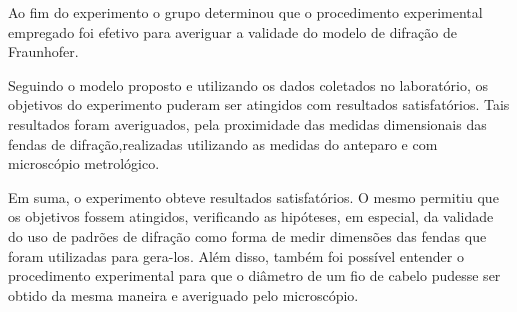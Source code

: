 Ao fim do experimento o grupo determinou que o procedimento experimental empregado foi efetivo para averiguar a validade do modelo de difração de Fraunhofer.

Seguindo o modelo proposto e utilizando os dados coletados no laboratório, os objetivos do experimento puderam ser atingidos com resultados satisfatórios. Tais resultados foram averiguados, pela proximidade das medidas dimensionais das fendas de difração,realizadas utilizando as medidas do anteparo e com microscópio metrológico.

Em suma, o experimento obteve resultados satisfatórios. O mesmo permitiu que os objetivos fossem atingidos, verificando as hipóteses, em especial, da validade do uso de padrões de difração como forma de medir dimensões das fendas que foram utilizadas para gera-los. Além disso, também foi possível entender o procedimento experimental para que o diâmetro de um fio de cabelo pudesse ser obtido da mesma maneira e averiguado pelo microscópio. 